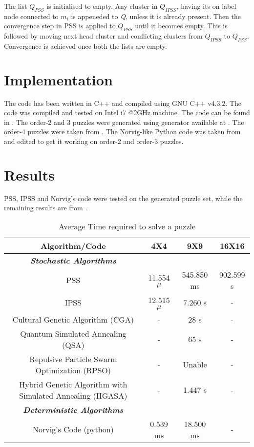 \documentclass[a4paper]{article}
\begin{document}
The list $Q_{PSS}$ is initialised to empty. Any cluster in $Q_{IPSS}$, having its on label node connected to $m_i$ is appeneded to {\em Q}, unless it is already present. Then the convergence step in PSS is applied to $Q_{PSS}$ until it becomes empty. This is followed by moving next head cluster and conflicting clusters from $Q_{IPSS}$ to $Q_{PSS}$. Convergence is achieved once both the lists are empty.
\section{Implementation}
The code has been written in C++ and compiled using GNU C++ v4.3.2. The code was compiled and tested on Intel i7 @2GHz machine. The code can be found in \cite{webMangwani}\cite{webKewalramani}. The order-2 and 3 puzzles were generated using generator available at \cite{web23Generator}. The order-4 puzzles were taken from \cite{web4Generator}. The Norvig-like Python code was taken from \cite{webNorvigLikeCode} and edited to get it working on order-2 and order-3 puzzles.

\section{Results}
PSS, IPSS and Norvig's code were tested on the generated puzzle set, while the remaining results are from \cite{uww}.
\begin{table}[H]
  \caption{Average Time required to solve a puzzle}
  \smallskip
  \begin{center}
    \begin{tabular}{|c|c|c|c|}
      \hline {\bf Algorithm/Code} & {\bf 4X4} & {\bf 9X9} & {\bf 16X16}\\\hline
      {\bf\em Stochastic Algorithms} & & &\\
      PSS\cite{mainref} & 11.554$\mu$ & 545.850 ms & 902.599 s\\
      IPSS\cite{mainref} & 12.515$\mu$ & 7.260 s & - \\
      Cultural Genetic Algorithm (CGA)\cite{uww} & - & 28 s & - \\
      Quantum Simulated Annealing (QSA)\cite{uww} & - & 65 s & - \\
      Repulsive Particle Swarm Optimization (RPSO)\cite{uww} & - & Unable & - \\
      Hybrid Genetic Algorithm with Simulated Annealing (HGASA)\cite{uww} & - & 1.447 s & - \\\hline
      {\bf\em Deterministic Algorithms} & & &\\
      Norvig's Code (python)\cite{webNorvigCode} & 0.539 ms & 18.500 ms& - \\\hline
    \end{tabular}
  \end{center}
\end{table}
\end{document}
